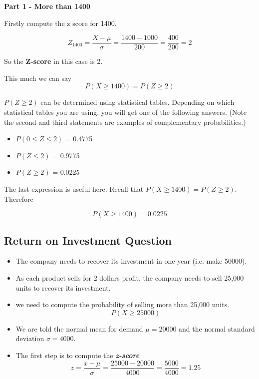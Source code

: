 \noindent \textbf{Part 1 -  More than 1400}

Firstly compute the z score for 1400.

\[ Z_{1400} =  \frac{X - \mu}{\sigma} = \frac{1400 - 1000}{200} = \frac{400}{200} = 2  \]

So the \textbf{Z-score} in this case is 2.

This much we can say
\[P(X \geq 1400) = P(Z \geq 2)\]

$P(Z \geq 2)$ can be determined using statistical tables.
Depending on which statistical tables you are using, you will get one of the following answers. (Note the 
second and third statements are examples of complementary probabilities.)
\begin{itemize}
	\item $P (0 \leq Z \leq 2)$ = 0.4775
	\item $P ( Z \leq 2)$ = 0.9775
	\item $P ( Z \geq 2)$ = 0.0225
\end{itemize}
The last expression is useful here. Recall that $P(X \geq 1400) = P(Z \geq 2)$. Therefore

\[P(X \geq 1400) = 0.0225\]


\subsection*{Return on Investment Question}

\begin{itemize}
	\item The company needs to recover its investment in one year (i.e. make 50000).
	\item As each product sells for 2 dollars profit, the company needs to sell 25,000 units to recover its investment.
	\item we need to compute the probability of selling more than 25,000 units.
	\[P(X \geq 25000) \]
	\item We are told the normal mean for demand $\mu =20000$ and the normal standard deviation $\sigma = 4000$.
	\item The first step is to compute the \textbf{\textit{z-score}}
	\[ z = \frac{x - \mu}{\sigma}  = \frac{25000 - 20000}{4000} = \frac{5000}{4000} = 1.25\]
\end{itemize}







